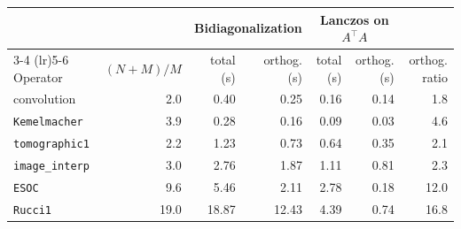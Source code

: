 \begin{tabular}{lrrrrrr}
\toprule
& & \multicolumn{2}{c}{Bidiagonalization} & \multicolumn{2}{c}{Lanczos on $A^\top A$} & \\
\cmidrule(lr){3-4} \cmidrule(lr){5-6}
Operator & $(N{+}M)/M$ & total (s) & orthog. (s) & total (s) & orthog. (s) & orthog. ratio \\
\midrule
convolution & 2.0 & 0.40 & 0.25 & 0.16 & 0.14 & 1.8 \\
\texttt{Kemelmacher} & 3.9 & 0.28 & 0.16 & 0.09 & 0.03 & 4.6 \\
\texttt{tomographic1} & 2.2 & 1.23 & 0.73 & 0.64 & 0.35 & 2.1 \\
\texttt{image\_interp} & 3.0 & 2.76 & 1.87 & 1.11 & 0.81 & 2.3 \\
\texttt{ESOC} & 9.6 & 5.46 & 2.11 & 2.78 & 0.18 & 12.0 \\
\texttt{Rucci1} & 19.0 & 18.87 & 12.43 & 4.39 & 0.74 & 16.8 \\
\bottomrule
\end{tabular}
